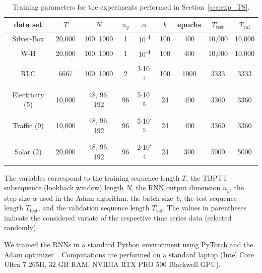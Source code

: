 \documentclass{article} %
\begin{document}
\begin{table}
	\caption{Training parameters for the experiments performed in Section~\ref{sec:exp_TS}.}
	\label{tab:res_sysid_app}
	\begin{center}
	\begin{threeparttable}
		\begingroup\footnotesize\sf
		\addtolength{\tabcolsep}{0.2em}
	
		\begin{tabular}{ccccccccc}
			\toprule
			data set
			& $T$ & $N$ &$n_y$ & $\alpha$  & $b$ & epochs & $T_{\mathrm{test}}$ & $T_{\mathrm{val}}$\\
			\midrule
			Silver-Box & 20,000 & 100..1000 & 1& 10\textsuperscript{-4} & 100 & 400  & 10,000 & 10,000 \\
			W-H        & 20,000 & 100..1000 & 1& 10\textsuperscript{-4} & 100 & 400  & 10,000 & 10,000 \\
			RLC        & 6667 & 100..1000 & 2& 3$\cdot$10\textsuperscript{-4} & 100 &  1000 & 3333 & 3333 \\
			\midrule
			Electricity (5) & 10,000 & 48, 96, 192 & 96& 5$\cdot$10\textsuperscript{-5} & 24 & 400  & 3360 & 3360\\
			Traffic (9)     & 10,000 & 48, 96, 192 & 96& 5$\cdot$10\textsuperscript{-5} & 24 & 400  & 3360 & 3360\\
			Solar (2)       & 20,000 & 48, 96, 192 & 96& 2$\cdot$10\textsuperscript{-4} & 24 & 300  & 5000 & 5000\\
			\bottomrule
		\end{tabular}
		\endgroup
		\begin{tablenotes}
			\item{\small The variables correspond to the training sequence length $T$, the TBPTT subsequence (lookback window) length $N$, the RNN output dimension $n_y$, the step size $\alpha$ used in the Adam algorithm, the batch size~$b$, the test sequence length $T_{\mathrm{test}}$, and the validation sequence length $T_{\mathrm{val}}$. The values in parentheses indicate the considered variate of the respective time series data (selected randomly).}
		\end{tablenotes}
	\end{threeparttable}
	\end{center}
\end{table}


We trained the RNNs in a standard Python environment using PyTorch and the Adam optimizer~\citep{Kingma2015}. Computations are performed on a standard laptop (Intel Core Ultra 7 265H, 32 GB RAM, NVIDIA RTX PRO 500 Blackwell GPU).
\end{document}
